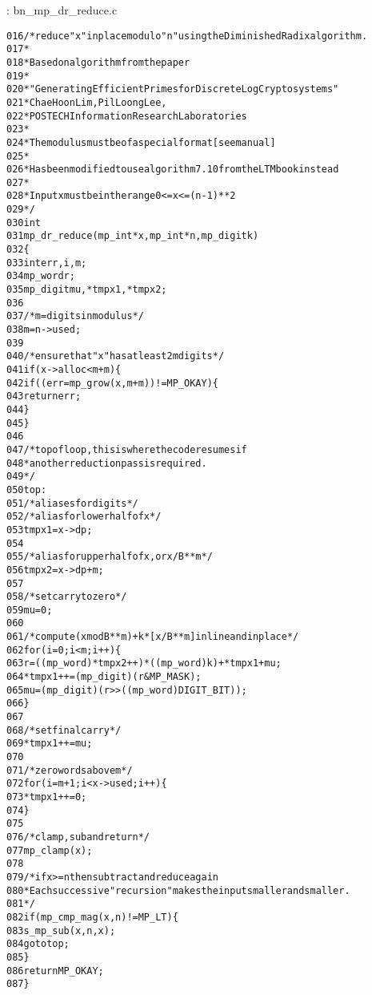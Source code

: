 \documentclass[b5paper]{book}
\begin{document}
\vspace{+3mm}\begin{small}
\hspace{-5.1mm}{\bf File}: bn\_mp\_dr\_reduce.c
\vspace{-3mm}
\begin{alltt}
016   /* reduce "x" in place modulo "n" using the Diminished Radix algorithm.
017    *
018    * Based on algorithm from the paper
019    *
020    * "Generating Efficient Primes for Discrete Log Cryptosystems"
021    *                 Chae Hoon Lim, Pil Loong Lee,
022    *          POSTECH Information Research Laboratories
023    *
024    * The modulus must be of a special format [see manual]
025    *
026    * Has been modified to use algorithm 7.10 from the LTM book instead
027    *
028    * Input x must be in the range 0 <= x <= (n-1)**2
029    */
030   int
031   mp_dr_reduce (mp_int * x, mp_int * n, mp_digit k)
032   \{
033     int      err, i, m;
034     mp_word  r;
035     mp_digit mu, *tmpx1, *tmpx2;
036   
037     /* m = digits in modulus */
038     m = n->used;
039   
040     /* ensure that "x" has at least 2m digits */
041     if (x->alloc < m + m) \{
042       if ((err = mp_grow (x, m + m)) != MP_OKAY) \{
043         return err;
044       \}
045     \}
046   
047   /* top of loop, this is where the code resumes if
048    * another reduction pass is required.
049    */
050   top:
051     /* aliases for digits */
052     /* alias for lower half of x */
053     tmpx1 = x->dp;
054   
055     /* alias for upper half of x, or x/B**m */
056     tmpx2 = x->dp + m;
057   
058     /* set carry to zero */
059     mu = 0;
060   
061     /* compute (x mod B**m) + k * [x/B**m] inline and inplace */
062     for (i = 0; i < m; i++) \{
063         r         = ((mp_word)*tmpx2++) * ((mp_word)k) + *tmpx1 + mu;
064         *tmpx1++  = (mp_digit)(r & MP_MASK);
065         mu        = (mp_digit)(r >> ((mp_word)DIGIT_BIT));
066     \}
067   
068     /* set final carry */
069     *tmpx1++ = mu;
070   
071     /* zero words above m */
072     for (i = m + 1; i < x->used; i++) \{
073         *tmpx1++ = 0;
074     \}
075   
076     /* clamp, sub and return */
077     mp_clamp (x);
078   
079     /* if x >= n then subtract and reduce again
080      * Each successive "recursion" makes the input smaller and smaller.
081      */
082     if (mp_cmp_mag (x, n) != MP_LT) \{
083       s_mp_sub(x, n, x);
084       goto top;
085     \}
086     return MP_OKAY;
087   \}
\end{alltt}
\end{small}
\end{document}
